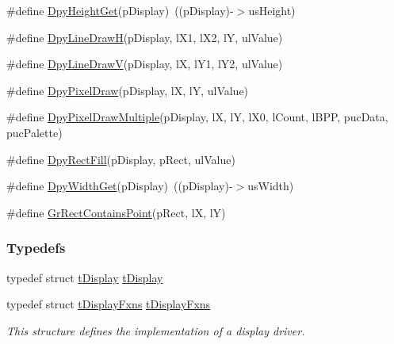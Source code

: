 \begin{DoxyCompactItemize}
\item 
\#define \hyperlink{group__primitives__api_ga541c63fcce8846a3f5cdb2d125f437d5}{Dpy\+Height\+Get}(p\+Display)~((p\+Display)-\/$>$us\+Height)
\item 
\#define \hyperlink{group__primitives__api_ga1d43358f05529bb6d9aa4d0daccba49d}{Dpy\+Line\+Draw\+H}(p\+Display,  l\+X1,  l\+X2,  l\+Y,  ul\+Value)
\item 
\#define \hyperlink{group__primitives__api_ga94c839d4e7f87e4881a4bb099425dca4}{Dpy\+Line\+Draw\+V}(p\+Display,  l\+X,  l\+Y1,  l\+Y2,  ul\+Value)
\item 
\#define \hyperlink{group__primitives__api_ga02c56228affc2d89eee30054cce3c59c}{Dpy\+Pixel\+Draw}(p\+Display,  l\+X,  l\+Y,  ul\+Value)
\item 
\#define \hyperlink{group__primitives__api_ga1838b1dd4ef2a8e109e10e8de19ee78f}{Dpy\+Pixel\+Draw\+Multiple}(p\+Display,  l\+X,  l\+Y,  l\+X0,  l\+Count,  l\+B\+P\+P,  puc\+Data, puc\+Palette)
\item 
\#define \hyperlink{group__primitives__api_ga3b26d580d4523d639c77b17b8d52d22b}{Dpy\+Rect\+Fill}(p\+Display,  p\+Rect,  ul\+Value)
\item 
\#define \hyperlink{group__primitives__api_ga0a967ef53683123dc57ff3b6ed096289}{Dpy\+Width\+Get}(p\+Display)~((p\+Display)-\/$>$us\+Width)
\item 
\#define \hyperlink{group__primitives__api_gad87e27477b181580adc6dcf5d34a3308}{Gr\+Rect\+Contains\+Point}(p\+Rect,  l\+X,  l\+Y)
\end{DoxyCompactItemize}
\subsubsection*{Typedefs}
\begin{DoxyCompactItemize}
\item 
typedef struct \hyperlink{structt_display}{t\+Display} \hyperlink{group__primitives__api_gab21d3a88cc08e5621451ebb6a7a2f18a}{t\+Display}
\item 
typedef struct \hyperlink{structt_display_fxns}{t\+Display\+Fxns} \hyperlink{group__primitives__api_ga58add1ad881d3b29fdbb7ff55421c0a1}{t\+Display\+Fxns}
\begin{DoxyCompactList}\small\item\em This structure defines the implementation of a display driver. \end{DoxyCompactList}\end{DoxyCompactItemize}
